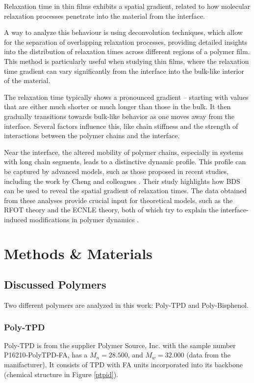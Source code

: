 Relaxation time in thin films exhibits a spatial gradient, related to how molecular relaxation processes penetrate into the material from the interface.

A way to analyze this behaviour is using deconvolution techniques, which allow for the separation of overlapping relaxation processes, providing detailed insights into the distribution of relaxation times across different regions of a polymer film. This method is particularly useful when studying thin films, where the relaxation time gradient can vary significantly from the interface into the bulk-like interior of the material.

The relaxation time typically shows a pronounced gradient -- starting with values that are either much shorter or much longer than those in the bulk. It then gradually transitions towards bulk-like behavior as one moves away from the interface. Several factors influence this, like chain stiffness and the strength of interactions between the polymer chains and the interface.

Near the interface, the altered mobility of polymer chains, especially in systems with long chain segments, leads to a distinctive dynamic profile. This profile can be captured by advanced models, such as those proposed in recent studies, including the work by Cheng and colleagues \cite{cheng2024}.
Their study highlights how \ac{BDS} can be used to reveal the spatial gradient of relaxation times. The data obtained from these analyses provide crucial input for theoretical models, such as the \ac{RFOT} theory and the \ac{ECNLE} theory, both of which try to explain the interface-induced modifications in polymer dynamics \cite{cheng2024}.


\chapter{Methods \& Materials}
\section{Discussed Polymers}
Two different polymers are analyzed in this work: \ac{Poly-TPD} and \ac{Poly-Bisphenol}.
\subsection{Poly-TPD}
Poly-TPD is from the supplier Polymer Source, Inc.{\texttrademark}  with the sample number P16210-PolyTPD-FA, has a $M_n = 28.500$, and $M_w = 32.000$ (data from the manifacturer). It consists of \ac{TPD} with \ac{FA} units incorporated into its backbone (chemical structure in Figure \ref{ptpid}).


